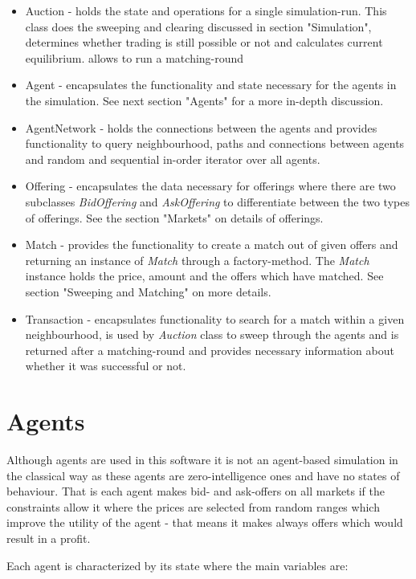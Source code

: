 \documentclass[Bachelorarbeit.tex]{subfiles}
\begin{document}
\begin{itemize}
\item Auction - holds the state and operations for a single simulation-run. This class does the sweeping and clearing discussed in section "Simulation", determines whether trading is still possible or not and calculates current equilibrium.  allows to run a matching-round
\item Agent - encapsulates the functionality and state necessary for the agents in the simulation. See next section "Agents" for a more in-depth discussion.
\item AgentNetwork - holds the connections between the agents and provides functionality to query neighbourhood, paths and connections between agents and random and sequential in-order iterator over all agents.
\item Offering - encapsulates the data necessary for offerings where there are two subclasses \textit{BidOffering} and \textit{AskOffering} to differentiate between the two types of offerings. See the section "Markets" on details of offerings.
\item Match - provides the functionality to create a match out of given offers and returning an instance of \textit{Match} through a factory-method. The \textit{Match} instance holds the price, amount and the offers which have matched. See section "Sweeping and Matching" on more details.
\item Transaction - encapsulates functionality to search for a match within a given neighbourhood, is used by \textit{Auction} class to sweep through the agents and is returned after a matching-round and provides necessary information about whether it was successful or not.
\end{itemize}

\section{Agents}
Although agents are used in this software it is not an agent-based simulation in the classical way as these agents are zero-intelligence ones and have no states of behaviour. That is each agent makes bid- and ask-offers on all markets if the constraints allow it where the prices are selected from random ranges which improve the utility of the agent - that means it makes always offers which would result in a profit.

\medskip

Each agent is characterized by its state where the main variables are:
\end{document}
